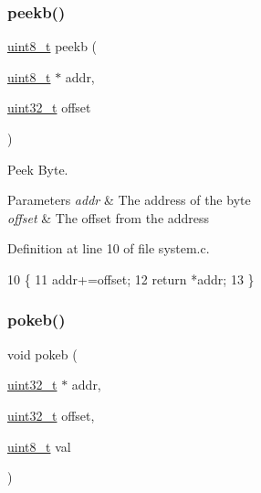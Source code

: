 \subsubsection{\texorpdfstring{peekb()}{peekb()}}
{\footnotesize\ttfamily \hyperlink{a00125_aba7bc1797add20fe3efdf37ced1182c5_aba7bc1797add20fe3efdf37ced1182c5}{uint8\+\_\+t} peekb (\begin{DoxyParamCaption}\item[{\hyperlink{a00125_aba7bc1797add20fe3efdf37ced1182c5_aba7bc1797add20fe3efdf37ced1182c5}{uint8\+\_\+t} $\ast$}]{addr,  }\item[{\hyperlink{a00125_a435d1572bf3f880d55459d9805097f62_a435d1572bf3f880d55459d9805097f62}{uint32\+\_\+t}}]{offset }\end{DoxyParamCaption})}



Peek Byte. 


\begin{DoxyParams}{Parameters}
{\em addr} & The address of the byte \\
\hline
{\em offset} & The offset from the address \\
\hline
\end{DoxyParams}


Definition at line 10 of file system.\+c.


\begin{DoxyCode}
10                                               \{
11     addr+=offset;
12     \textcolor{keywordflow}{return} *addr;
13 \}
\end{DoxyCode}
\mbox{\label{a00119_aa291c9926b84df379482632e80ec7c47_aa291c9926b84df379482632e80ec7c47}} 
\subsubsection{\texorpdfstring{pokeb()}{pokeb()}}
{\footnotesize\ttfamily void pokeb (\begin{DoxyParamCaption}\item[{\hyperlink{a00125_a435d1572bf3f880d55459d9805097f62_a435d1572bf3f880d55459d9805097f62}{uint32\+\_\+t} $\ast$}]{addr,  }\item[{\hyperlink{a00125_a435d1572bf3f880d55459d9805097f62_a435d1572bf3f880d55459d9805097f62}{uint32\+\_\+t}}]{offset,  }\item[{\hyperlink{a00125_aba7bc1797add20fe3efdf37ced1182c5_aba7bc1797add20fe3efdf37ced1182c5}{uint8\+\_\+t}}]{val }\end{DoxyParamCaption})}



